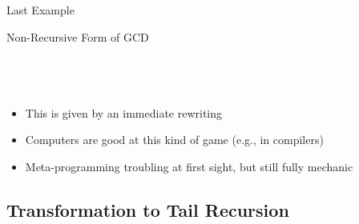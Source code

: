 \begin{frame}{Last Example}
\begin{block}{Non-Recursive Form of GCD}
\begin{columns}
    \begin{column}{.001\linewidth}~\end{column}
  \end{columns}
  \end{block}

  \begin{itemize}
  \item This is given by an immediate rewriting
  \item Computers are good at this kind of game (e.g., in compilers)
  \item Meta-programming troubling at first sight, but still fully mechanic
  \end{itemize}
\end{frame}
\subsection{Transformation to Tail Recursion}
